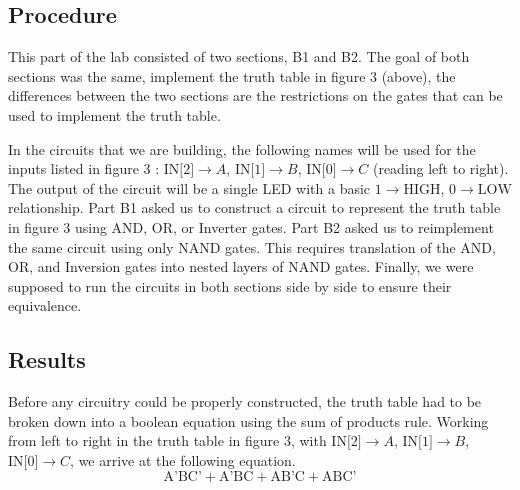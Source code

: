 \documentclass[a4paper,11pt]{article}
\begin{document}
\subsection{Procedure}
This part of the lab consisted of two sections, B1 and B2. The goal of both sections was the same, implement the truth table in figure 3 (above), the differences between the two sections are the restrictions on the gates that can be used to implement the truth table. \par
In the circuits that we are building, the following names will be used for the inputs listed in figure 3 : $\text{IN[2]} \to A$, $\text{IN[1]} \to B$, $\text{IN[0]} \to C$ (reading left to right). The output of the circuit will be a single LED with a basic $1 \to \text{HIGH}$, $0 \to \text{LOW}$ relationship. Part B1 asked us to construct a circuit to represent the truth table in figure 3 using AND, OR, or Inverter gates. Part B2 asked us to reimplement the same circuit using only NAND gates. This requires translation of the AND, OR, and Inversion gates into nested layers of NAND gates. Finally, we were supposed to run the circuits in both sections side by side to ensure their equivalence. 

\subsection{Results}
Before any circuitry could be properly constructed, the truth table had to be broken down into a boolean equation using the sum of products rule. Working from left to right in the truth table in figure 3, with $\text{IN[2]} \to A$, $\text{IN[1]} \to B$, $\text{IN[0]} \to C$, we arrive at the following equation.
 \begin{equation} \text{A'BC'} + \text{A'BC} + \text{AB'C} + \text{ABC'} \end{equation}
\end{document}
